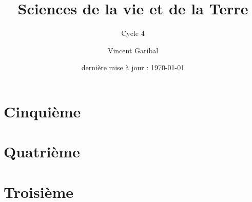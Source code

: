 \documentclass[fontsize=10pt,DIV=30]{scrbook}
\author{Vincent Garibal}
\title{Sciences de la vie et de la Terre}
\subtitle{Cycle 4}
\date{dernière mise à jour : \today}
\begin{document}
\frontmatter

\maketitle
\tableofcontents

\mainmatter

\part{Cinquième}

\part{Quatrième}

\part{Troisième}

\appendix

\backmatter
\end{document}
